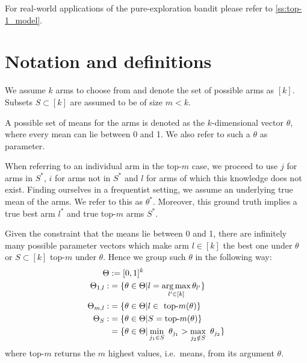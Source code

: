 For real-world applications of the pure-exploration bandit please refer to
\ref{ss:top-1_model}.

\section{Notation and definitions}\label{section:notation}
We assume $k$ arms to choose from and denote the set of possible arms as $[k]$.
Subsets $S \subset [k]$ are assumed to be of size $m < k$.

A possible set of means for the arms is denoted as the $k$-dimensional vector
$\theta$, where every mean can lie between 0 and 1. We also refer to such a
$\theta$ as parameter.

When referring to an individual arm in the top-$m$ case, we proceed to use $j$
for arms in $S^*$, $i$ for arms not in $S^*$ and $l$ for arms of which this
knowledge does not exist. Finding ourselves in a frequentist setting, we assume
an underlying true mean of the arms. We refer to this as $\theta^*$. Moreover,
this ground truth implies a true best arm $l^*$ and true top-$m$ arms $S^*$.

Given the constraint that the means lie between 0 and 1, there are infinitely
many possible parameter vectors which make arm $l \in [k]$ the best one under
$\theta$ or $S \subset [k]$ top-$m$ under $\theta$. Hence we group such $\theta$
in the following way:
\begin{align}
  \Theta &:= [0, 1]^k \\
  \Theta_{1, l} :&= \{\theta \in \Theta | l = \operatorname*{arg\,max}_{l' \in [k]}
      \theta_{l'}\} \\
  \Theta_{m, l} :&= \{\theta \in \Theta | l \in \text{ top-}m(\theta)\} \\
  \Theta_S :&= \{\theta \in \Theta | S = \text{top-}m(\theta)\} \\
    &= \{ \theta \in \Theta| \min_{j_1 \in S}\ \theta_{j_1} > \max_{j_2 \notin
      S}\ \theta_{j_2}\}
\end{align}
where top-$m$ returns the $m$ highest values, i.e.\ means, from its argument
$\theta$.

